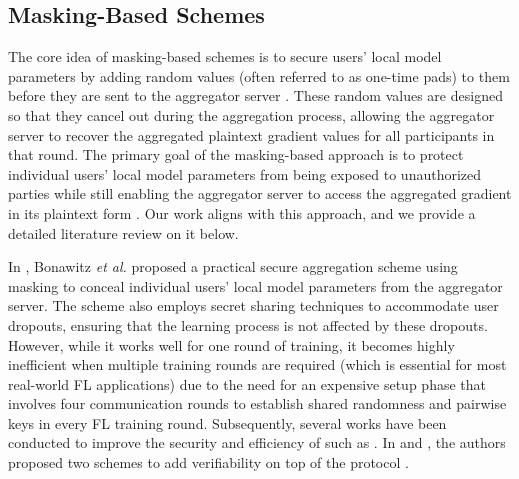 \subsection{Masking-Based Schemes}
The core idea of masking-based schemes is to secure users' local model parameters by adding random values (often referred to as one-time pads) to them before they are sent to the aggregator server \cite{Bonawitz2017}. These random values are designed so that they cancel out during the aggregation process, allowing the aggregator server to recover the aggregated plaintext gradient values for all participants in that round. The primary goal of the masking-based approach is to protect individual users' local model parameters from being exposed to unauthorized parties while still enabling the aggregator server to access the aggregated gradient in its plaintext form \cite{Liu2022}.  Our work aligns with this approach, and we provide a detailed literature review on it below. 
\par 
In \cite{Bonawitz2017}, Bonawitz \emph{et al.} proposed a practical secure aggregation scheme using masking to conceal individual users' local model parameters from the aggregator server. The scheme also employs secret sharing techniques to accommodate user dropouts, ensuring that the learning process is not affected by these dropouts. However, while it works well for one round of training, it becomes highly inefficient when multiple training rounds are required (which is essential for most real-world FL applications) due to the need for an expensive setup phase that involves four communication rounds to establish shared randomness and pairwise keys in every FL training round. 
Subsequently, several works have been conducted to improve the security and efficiency of \cite{Bonawitz2017} such as \cite{Xu2020, Guo2021, Fereidooni2021, Liu2023, Bell2020, Eltaras2023}. In \cite{Xu2020} and \cite{Guo2021}, the authors proposed two schemes to add verifiability on top of the protocol \cite{Bonawitz2017}. 
